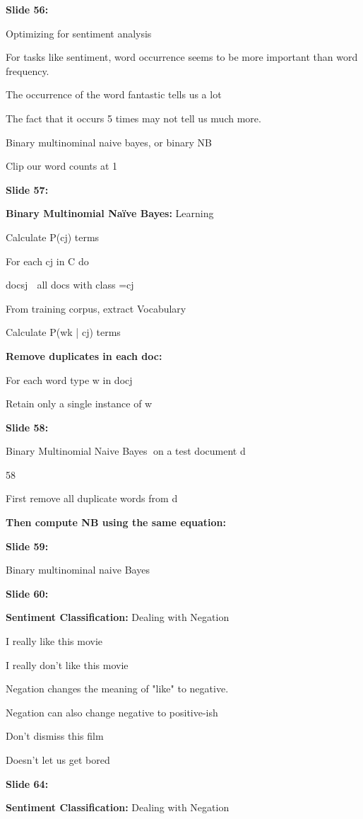 \documentclass[11pt,a4paper]{article}
\begin{document}
\textbf{Slide 56:}

Optimizing for sentiment analysis

For tasks like sentiment, word occurrence seems to be more important than word frequency.

The occurrence of the word fantastic tells us a lot

The fact that it occurs 5 times may not tell us much more.

Binary multinominal naive bayes, or binary NB

Clip our word counts at 1

\textbf{Slide 57:}

\textbf{Binary Multinomial Naïve Bayes:}  Learning

Calculate P(cj) terms

For each cj in C do

docsj  all docs with  class =cj

From training corpus, extract Vocabulary

Calculate P(wk | cj) terms

\textbf{Remove duplicates in each doc:} 

For each word type w in docj

Retain only a single instance of w

\textbf{Slide 58:}

Binary Multinomial Naive Bayes on a test document d

58

First remove all duplicate words from d

\textbf{Then compute NB using the same equation:} 

\textbf{Slide 59:}

Binary multinominal naive Bayes

\textbf{Slide 60:}

\textbf{Sentiment Classification:}  Dealing with Negation

I really like this movie

I really don't like this movie

Negation changes the meaning of "like" to negative.

Negation can also change negative to positive-ish

Don't dismiss this film

Doesn't let us get bored

\textbf{Slide 64:}

\textbf{Sentiment Classification:}  Dealing with Negation
\end{document}
